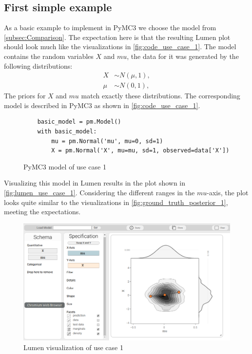 \documentclass{article}
\begin{document}
\subsection{First simple example}
As a basic example to implement in PyMC3 we choose the model from \autoref{subsec:Comparison}. The expectation here is that the resulting Lumen plot should look much like the visualizations in \autoref{fig:code_use_case_1}. The model contains the random variables $X$ and $mu$, the data for it was generated by the following  distributions:
\begin{equation}
\begin{split}
X &\sim N(\mu,1), \\
\mu &\sim N(0,1),
\end{split}
\end{equation}
The priors for $X$ and $mu$ match exactly these distributions. The corresponding model is described in PyMC3 as shown in \autoref{fig:code_use_case_1}.
\begin{figure}[h]
	\begin{lstlisting}
    basic_model = pm.Model()
	with basic_model:
		mu = pm.Normal('mu', mu=0, sd=1)
		X = pm.Normal('X', mu=mu, sd=1, observed=data['X'])
	\end{lstlisting}
	\caption[PyMC3 model of use case 1]{PyMC3 model of use case 1}
	\label{fig:code_use_case_1}
\end{figure}
Visualizing this model in Lumen results in the plot shown in \autoref{fig:lumen_use_case_1}. Considering the different ranges in the $mu$-axis, the plot looks quite similar to the visualizations in \autoref{fig:ground_truth_posterior_1}, meeting the expectations.
\begin{figure}
	\includegraphics[width=\textwidth]{images/lumen_use_case_1.png}
	\caption{Lumen visualization of use case 1}
	\label{fig:lumen_use_case_1}
\end{figure}
\end{document}
